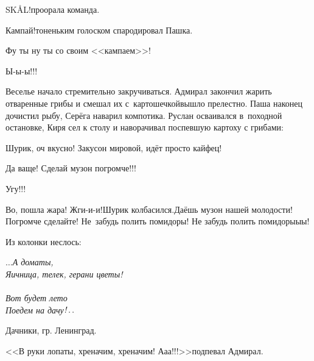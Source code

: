 \diagdash SKÅL!\mdash проорала команда.

\diagdash Кампай!\mdash тоненьким голоском спародировал Пашка.

\diagdash Фу ты ну ты со своим <<кампаем>>!

\diagdash Ы-ы-ы!!!

Веселье начало стремительно закручиваться. Адмирал закончил жарить отваренные грибы и смешал их с~картошечкой\mdash вышло прелестно. Паша наконец дочистил рыбу, Серёга наварил компотика. Руслан осваивался в~походной остановке, Киря сел к столу и наворачивал поспевшую картоху с грибами:

\diagdash Шурик, оч вкусно! Закусон мировой, идёт просто кайфец!

\diagdash Да ваще! Сделай музон погромче!!!

\diagdash Угу!!!

\diagdash Во, пошла жара! Жги-и-и!\mdash Шурик колбасился.\mdash Даёшь музон нашей молодости! Погромче сделайте! Не~забудь полить помидоры! Не забудь полить помидоры\sdash ы\sdash ы!

Из колонки неслось:

\vspace{0.3cm}
\noindent\textit{%
	\hspace*{3.2cm}$\ldots$А дома\mdash ты,\\
	\hspace*{3.2cm}Яичница, телек, герани цветы!\\
	\\
	\hspace*{3.2cm}Вот будет лето\mdash\\
	\hspace*{3.2cm}Поедем на дачу$\exldotsit$%
}

{\raggedleft \scriptsize \mdash Дачники, гр. Ленинград. \par}

\vspace{0.1cm}

\diagdash <<В руки лопаты, хреначим, хреначим! А\sdash а\sdash а!!!>>\mdash подпевал Адмирал.


